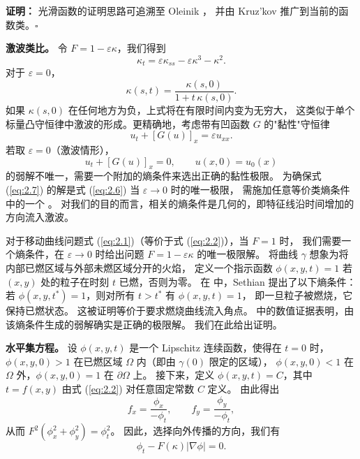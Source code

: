 \documentclass[11pt,a4paper]{article}
\begin{document}
\textbf{证明：} 光滑函数的证明思路可追溯至 Oleinik \cite{oleinik1956}，
并由 Kruz'kov \cite{kruzkov1970} 推广到当前的函数类。\hfill $\square$

\textbf{激波类比。} 
令 $F = 1 - \varepsilon\kappa$，我们得到
\begin{equation}
\kappa_t = \varepsilon\kappa_{ss} - \varepsilon\kappa^3 - \kappa^2.
\label{eq:2.5}
\end{equation}
对于 $\varepsilon=0$，
\begin{equation}
\kappa(s,t) = \frac{\kappa(s,0)}{1 + t\,\kappa(s,0)}.
\end{equation}
如果 $\kappa(s,0)$ 在任何地方为负，上式将在有限时间内变为无穷大，
这类似于单个标量凸守恒律中激波的形成。更精确地，考虑带有凹函数 $G$ 的"黏性"守恒律
\begin{equation}
u_t + [G(u)]_x = \varepsilon u_{xx}.
\label{eq:2.6}
\end{equation}
若取 $\varepsilon = 0$（激波情形），
\begin{equation}
u_t + [G(u)]_x = 0,\qquad u(x,0) = u_0(x)
\label{eq:2.7}
\end{equation}
的弱解不唯一，需要一个附加的熵条件来选出正确的黏性极限。
为确保式 (\ref{eq:2.7}) 的解是式 (\ref{eq:2.6}) 当 $\varepsilon \to 0$ 时的唯一极限，
需施加任意等价类熵条件中的一个 \cite{lax1957, kruzkov1970, oleinik1956}。
对我们的目的而言，相关的熵条件是几何的，即特征线沿时间增加的方向流入激波。

对于移动曲线问题式 (\ref{eq:2.1})（等价于式 (\ref{eq:2.2})），当 $F=1$ 时，
我们需要一个熵条件，在 $\varepsilon \to 0$ 时给出问题 $F = 1 - \varepsilon\kappa$ 的唯一极限解。
将曲线 $\gamma$ 想象为将内部已燃区域与外部未燃区域分开的火焰，
定义一个指示函数 $\phi(x,y,t) = 1$ 若 $(x,y)$ 处的粒子在时刻 $t$ 已燃，否则为零。
在 \cite{sethian1982} 中，Sethian 提出了以下熵条件：
若 $\phi(x,y,t^*) = 1$，则对所有 $t > t^*$ 有 $\phi(x,y,t) = 1$，
即一旦粒子被燃烧，它保持已燃状态。
这被证明等价于要求燃烧曲线流入角点。
\cite{sethian1985} 中的数值证据表明，由该熵条件生成的弱解确实是正确的极限解。
我们在此给出证明。

\textbf{水平集方程。}
设 $\phi(x,y,t)$ 是一个 Lipschitz 连续函数，使得在 $t=0$ 时，
$\phi(x,y,0) > 1$ 在已燃区域 $\Omega$ 内（即由 $\gamma(0)$ 限定的区域），
$\phi(x,y,0) < 1$ 在 $\Omega$ 外，$\phi(x,y,0) = 1$ 在 $\partial\Omega$ 上。
接下来，定义 $\phi(x,y,t) = C$，其中 $t = f(x,y)$ 由式 (\ref{eq:2.2}) 对任意固定常数 $C$ 定义。
由此得出
\begin{equation}
f_x = \frac{\phi_x}{-\phi_t},\qquad f_y = \frac{\phi_y}{-\phi_t},
\end{equation}
从而 $F^2(\phi_x^2 + \phi_y^2) = \phi_t^2$。
因此，选择向外传播的方向，我们有
\begin{equation}
\phi_t - F(\kappa)|\nabla\phi| = 0.
\label{eq:2.11}
\end{equation}
\end{document}
